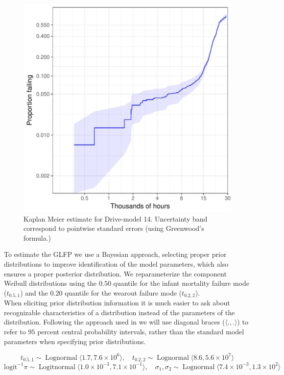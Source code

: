 \documentclass[12pt]{article}
\newcommand{\op}{\operatorname}
\begin{document}
\begin{figure}[H]
\centering
  \includegraphics[width=.8\textwidth]{km14-prob}
  \caption{Kaplan Meier estimate for Drive-model 14.  Uncertainty band correspond to pointwise standard errors (using Greenwood's formula.)}
  \label{fig1}
\end{figure}


To estimate the GLFP we use a Bayesian approach, selecting proper prior distributions to improve identification of the model parameters, which also ensures a proper posterior distribution. We reparameterize the component Weibull distributions using the $0.50$ quantile for the infant mortality failure mode ($t_{0.5,1}$) and the $0.20$ quantile for the wearout failure mode ($t_{0.2,2}$). \\

When eliciting prior distribution information it is much easier to ask about recognizable characteristics of a distribution instead of the parameters of the distribution.  Following the approach used in \cite[Section 15.2.2]{intervals} we will use diagonal braces ($\langle.,.\rangle$) to refer to $95$ percent central probability intervals, rather than the standard model parameters when specifying prior distributions.

$$t_{0.5,1} \sim \op{Lognormal} \langle 1.7,7.6\times 10^6 \rangle,\quad
t_{0.2,2} \sim \op{Lognormal}\langle 8.6, 5.6\times 10^7 \rangle$$
$$\mbox{logit}^{-1}\pi \sim \op{Logitnormal}\langle 1.0\times 10^{-3}, 7.1\times 10^{-1} \rangle,\quad
\sigma_1, \sigma_2 \sim \op{Lognormal}\langle 7.4 \times 10 ^{-3} ,1.3 \times 10^2 \rangle $$
\end{document}
